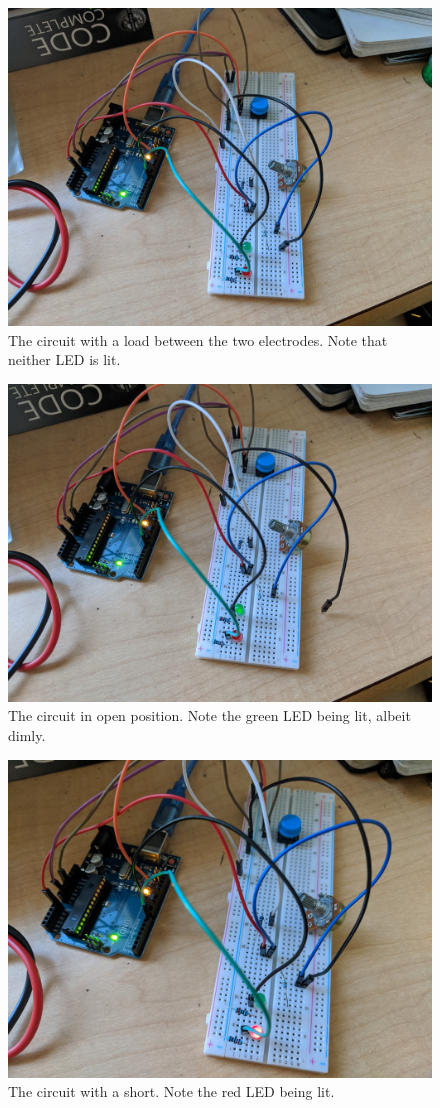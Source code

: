 \documentclass[12pt]{article}
\begin{document}
\begin{enumerate}[a.]
    \begin{figure}[H]
      \centering
      \includegraphics[width=0.8\linewidth]{neither.jpg}
      \caption{The circuit with a load between the two electrodes. Note that neither LED is lit.}
      \label{fig:neither}
    \end{figure}
    \begin{figure}[H]
      \centering
      \includegraphics[width=0.8\linewidth]{open.jpg}
      \caption{The circuit in open position. Note the green LED being lit, albeit dimly.}
      \label{fig:open}
    \end{figure}
    \begin{figure}[H]
      \centering
      \includegraphics[width=0.8\linewidth]{short.jpg}
      \caption{The circuit with a short. Note the red LED being lit.}
      \label{fig:short}
    \end{figure}
\end{enumerate}
\end{document}
